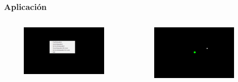 \documentclass[pdf]{beamer}
\begin{document}
\begin{frame}
	\frametitle{Aplicación}
	\begin{columns}
		\begin{column}{0.65\textwidth}
				\begin{figure}
				\centering
				
				\includegraphics[width=\textwidth]{menu}
				
			\end{figure}
		\end{column}
	\begin{column}{0.35\textwidth}
	\begin{figure}
		\centering
		
		\includegraphics[width=\textwidth]{cursor}
		
	\end{figure}
	\end{column}
	\end{columns}
	

\end{frame}
\end{document}
